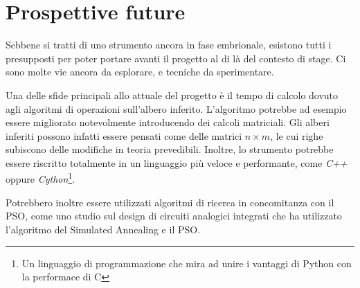 \section{Prospettive future}
Sebbene si tratti di uno strumento ancora in fase embrionale, esistono tutti i presupposti per poter portare avanti il progetto al di là del contesto di stage. Ci sono molte vie ancora da esplorare, e tecniche da sperimentare.

Una delle sfide principali allo attuale del progetto è il tempo di calcolo dovuto agli algoritmi di operazioni sull'albero inferito. L'algoritmo potrebbe ad esempio essere migliorato notevolmente introducendo dei calcoli matriciali. Gli alberi inferiti possono infatti essere pensati come delle matrici $n \times m$, le cui righe subiscono delle modifiche in teoria prevedibili. Inoltre, lo strumento potrebbe essere riscritto totalmente in un linguaggio più veloce e performante, come \textit{C++} oppure \textit{Cython}\footnote{Un linguaggio di programmazione che mira ad unire i vantaggi di Python con la performace di C}. 

Potrebbero inoltre essere utilizzati algoritmi di ricerca in concomitanza con il PSO, come uno studio sul design di circuiti analogici integrati \cite{designanalogsapso} che ha utilizzato l'algoritmo del Simulated Annealing e il PSO.